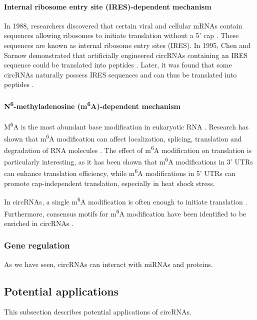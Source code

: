 \paragraph{Internal ribosome entry site (IRES)-dependent mechanism}
In 1988, researchers discovered that certain viral and cellular mRNAs contain
sequences allowing ribosomes to initiate translation without a 5' cap
\supercite{pelletier_internal_1988, jang_segment_1988}. These sequences are
known as internal ribosome entry sites (IRES). In 1995, Chen and Sarnow
demonstrated that artificially engineered circRNAs containing an IRES sequence
could be translated into peptides \supercite{chen_initiation_1995}. Later, it
was found that some circRNAs naturally possess IRES sequences and can thus be
translated into peptides
\supercite{chen_expanding_2020,legnini_circ-znf609_2017,pamudurti_translation_2017}.

\paragraph{N\textsuperscript{6}-methyladenosine
    (m\textsuperscript{6}A)-dependent mechanism} M\textsuperscript{6}A is the most
abundant base modification in eukaryotic RNA
\supercite{yang_extensive_2017,li_pivotal_2014,wei_methylated_1975}. Research
has shown that m\textsuperscript{6}A modification can affect localization,
splicing, translation and degradation of RNA molecules
\supercite{yue_rna_2015,meyer_dynamic_2014}. The effect of m\textsuperscript{6}A
modification on translation is particularly interesting, as it has been shown
that m\textsuperscript{6}A modifications in 3' UTRs can enhance translation
efficiency\supercite{wang_n6-methyladenosine_2015}, while m\textsuperscript{6}A
modifications in 5' UTRs can promote cap-independent translation, especially in
heat shock stress\supercite{zhou_dynamic_2015,meyer_5_2015}.

In circRNAs, a single m\textsuperscript{6}A modification is often
enough to initiate translation \supercite{yang_extensive_2017}. Furthermore,
consensus motifs for m\textsuperscript{6}A modification have been identified to
be enriched in circRNAs \supercite{yang_extensive_2017}.

\subsubsection{Gene regulation}
As we have seen, circRNAs can interact with miRNAs and proteins.

\subsection{Potential applications}
This subsection describes potential applications of circRNAs.

